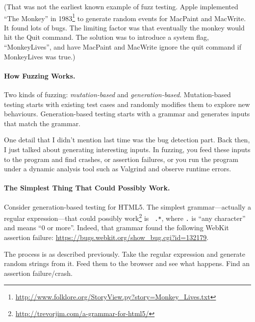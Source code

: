 \documentclass[11pt]{article}
\begin{document}
(That was not the earliest known example of fuzz testing. Apple
implemented ``The Monkey'' in 1983\footnote{\url{http://www.folklore.org/StoryView.py?story=Monkey_Lives.txt}}
to generate random events for
MacPaint and MacWrite. It found lots of bugs. The limiting factor was
that eventually the monkey would hit the Quit command.  The solution
was to introduce a system flag, ``MonkeyLives'', and have MacPaint and
MacWrite ignore the quit command if MonkeyLives was true.)

\paragraph{How Fuzzing Works.} 
Two kinds of fuzzing: \emph{mutation-based} and
\emph{generation-based}. Mutation-based testing starts with
existing test cases and randomly modifies them to explore new behaviours.
Generation-based testing starts with a grammar and generates
inputs that match the grammar.

One detail that I didn't mention last time was the bug detection
part.  Back then, I just talked about generating interesting
inputs. In fuzzing, you feed these inputs to the program and find
crashes, or assertion failures, or you run the program under a dynamic
analysis tool such as Valgrind and observe runtime errors.

\paragraph{The Simplest Thing That Could Possibly Work.}
Consider generation-based testing for HTML5.  The simplest grammar---actually a regular
expression---that could possibly
work\footnote{\url{http://trevorjim.com/a-grammar-for-html5/}} is {\tt
  .*}, where {\tt .} is ``any character'' and {\tt *} means ``0 or
more''. Indeed, that grammar found the following WebKit assertion failure:
\url{https://bugs.webkit.org/show_bug.cgi?id=132179}.

The process is as described previously. Take the regular expression
and generate random strings from it.  Feed them to the browser and see
what happens. Find an assertion failure/crash.
\end{document}
